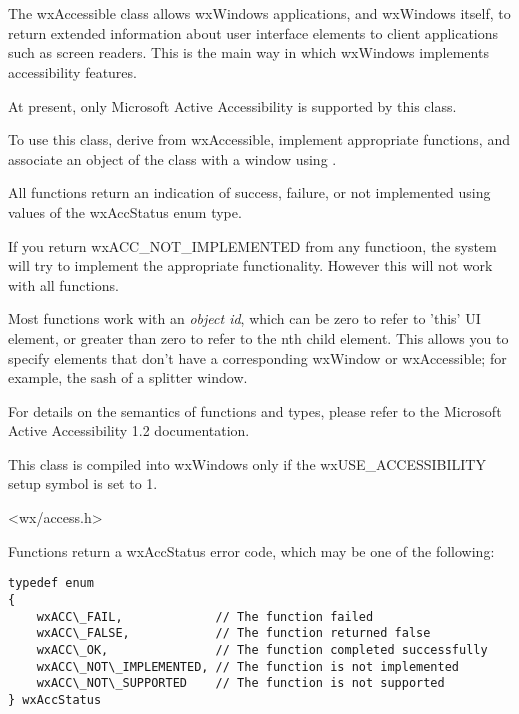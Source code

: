 %
%

\section{}\label{wxaccessible}

The wxAccessible class allows wxWindows applications, and
wxWindows itself, to return extended information about user interface elements
to client applications such as screen readers. This is the
main way in which wxWindows implements accessibility features.

At present, only Microsoft Active Accessibility is supported
by this class.

To use this class, derive from wxAccessible, implement appropriate
functions, and associate an object of the class with a
window using .

All functions return an indication of success, failure, or not implemented
using values of the wxAccStatus enum type.

If you return wxACC\_NOT\_IMPLEMENTED from any functioon, the system will try to
implement the appropriate functionality. However this will not work with
all functions.

Most functions work with an {\it object id}, which can be zero to refer to
'this' UI element, or greater than zero to refer to the nth child element.
This allows you to specify elements that don't have a corresponding wxWindow or
wxAccessible; for example, the sash of a splitter window.

For details on the semantics of functions and types, please refer to the
Microsoft Active Accessibility 1.2 documentation.

This class is compiled into wxWindows only if the wxUSE\_ACCESSIBILITY setup
symbol is set to 1.




<wx/access.h>


Functions return a wxAccStatus error code, which
may be one of the following:

{\small%
\begin{verbatim}
typedef enum
{
    wxACC\_FAIL,             // The function failed
    wxACC\_FALSE,            // The function returned false
    wxACC\_OK,               // The function completed successfully
    wxACC\_NOT\_IMPLEMENTED, // The function is not implemented
    wxACC\_NOT\_SUPPORTED    // The function is not supported
} wxAccStatus
\end{verbatim}}

